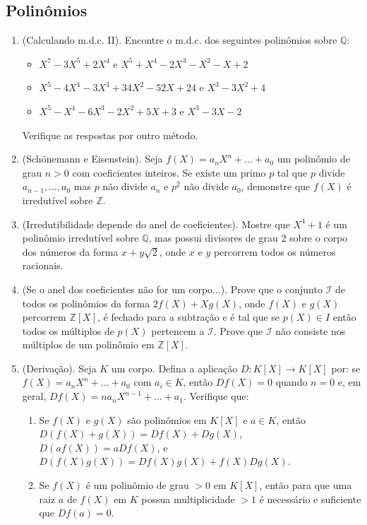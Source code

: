 \subsection{Polinômios}

\begin{enumerate}[label=5.\arabic*.]
\item (Calculando m.d.c. II). Encontre o m.d.c. dos seguintes polinômios sobre $\mathbb{Q}$:
    \begin{itemize}
        \item[(i)] $X^7 - 3X^5 + 2X^4$ e $X^5 + X^4 - 2X^3 - X^2 - X + 2$
        \item[(ii)] $X^5 - 4X^4 - 3X^3 + 34X^2 - 52X + 24$ e $X^3 - 3X^2 + 4$
        \item[(iii)] $X^5 - X^4 - 6X^3 -2X^2 + 5X + 3$ e $X^3 - 3X - 2$
    \end{itemize}
    Verifique as respostas por outro método.
    \item (Schönemann e Eisenstein). Seja $f(X) = a_n X^n + \dots + a_0$ um polinômio de grau $n > 0$ com coeficientes inteiros. Se existe um primo $p$ tal que $p$ divide $a_{n-1},\ldots,a_0$ mas $p$ não divide $a_n$ e $p^2$ não divide $a_0$, demonstre que $f(X)$ é irredutível sobre $\mathbb{Z}$.
    \item (Irredutibilidade depende do anel de coeficientes). Mostre que $X^4 + 1$ é um polinômio irredutível sobre $\mathbb{Q}$, mas possui divisores de grau 2 sobre o corpo dos números da forma $x + y \sqrt{2}$, onde $x$ e $y$ percorrem todos os números racionais.
    \item (Se o anel dos coeficientes não for um corpo...). Prove que o conjunto $\mathcal{I}$ de todos os polinômios da forma $2f(X) + Xg(X)$, onde $f(X)$ e $g(X)$ percorrem $\mathbb{Z}[X]$, é fechado para a subtração e é tal que se $p(X) \in I$ então todos os múltiplos de $p(X)$ pertencem a $\mathcal{I}$. Prove que $\mathcal{I}$ não consiste nos múltiplos de um polinômio em $\mathbb{Z}[X]$.
    \item (Derivação). Seja $K$ um corpo. Defina a aplicação $D: K[X] \to K[X]$ por: se $f(X) = a_n X^n + ... + a_0$ com $a_i \in K$, então $Df(X) = 0$ quando $n = 0$ e, em geral, $Df(X) = n a_n X^{n-1} + ... + a_1$. Verifique que:
    \begin{enumerate}
        \item[(i)] Se $f(X)$ e $g(X)$ são polinômios em $K[X]$ e $a \in K$, então $D(f(X) + g(X)) = Df(X) + Dg(X)$, $D(a f(X)) = a Df(X)$, e $D(f(X) g(X)) = Df(X) g(X) + f(X) Dg(X)$.
        \item[(ii)] Se $f(X)$ é um polinômio de grau $>0$ em $K[X]$, então para que uma raiz $a$ de $f(X)$ em $K$ possua multiplicidade $>1$ é necessário e suficiente que $Df(a) = 0$.

\end{enumerate}
\end{enumerate}

